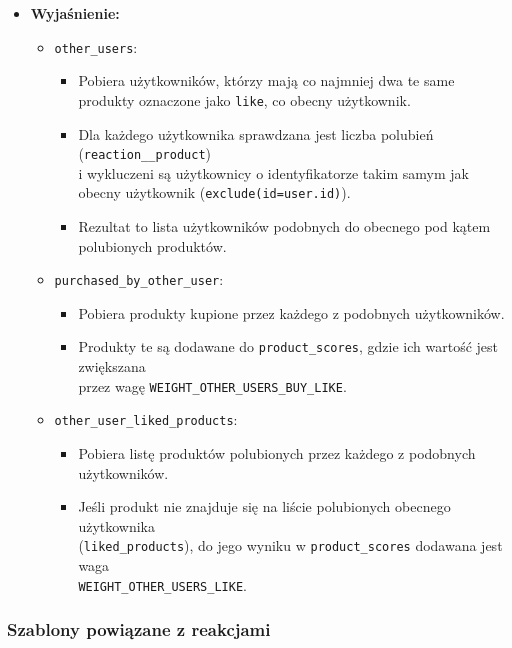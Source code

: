 \documentclass[12pt,a4paper,oneside]{article}
\theoremstyle{definition}
\numberwithin{equation}{section}
\begin{document}
\begin{itemize}
    \item \textbf{Wyjaśnienie:}
        \begin{itemize}
            \item \texttt{other\_users}: 
            \begin{itemize}
                \item Pobiera użytkowników, którzy mają co najmniej dwa te same produkty oznaczone jako \texttt{like}, co obecny użytkownik.
                \item Dla każdego użytkownika sprawdzana jest liczba polubień
                 (\texttt{reaction\_\_product})\\ i wykluczeni są użytkownicy o identyfikatorze takim samym jak obecny użytkownik (\texttt{exclude(id=user.id)}).
                \item Rezultat to lista użytkowników podobnych do obecnego pod kątem polubionych produktów.
            \end{itemize}
            \item \texttt{purchased\_by\_other\_user}:
            \begin{itemize}
                \item Pobiera produkty kupione przez każdego z podobnych użytkowników.
                \item Produkty te są dodawane do \texttt{product\_scores}, gdzie ich wartość
                 jest zwiększana\\ przez wagę \texttt{WEIGHT\_OTHER\_USERS\_BUY\_LIKE}.
            \end{itemize}
            \item \texttt{other\_user\_liked\_products}:
            \begin{itemize}
                \item Pobiera listę produktów polubionych przez każdego z podobnych użytkowników.
                \item Jeśli produkt nie znajduje się na liście polubionych obecnego użytkownika
                 \\(\texttt{liked\_products}), do jego wyniku w \texttt{product\_scores} 
                 dodawana jest waga\\ \texttt{WEIGHT\_OTHER\_USERS\_LIKE}.
            \end{itemize}
        \end{itemize}
\end{itemize}


\clearpage
\subsubsection{Szablony powiązane z reakcjami}
\end{document}
